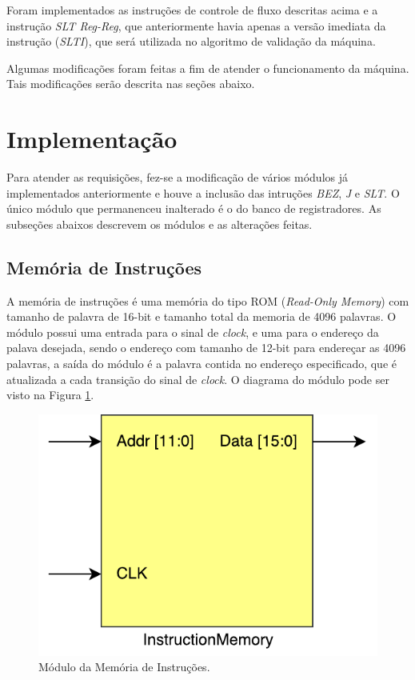 \documentclass[11pt,a4paper,titlepage]{article}
\begin{document}
Foram implementados as instruções de controle de fluxo descritas acima e a instrução \textit{SLT Reg-Reg}, que anteriormente havia apenas a versão imediata da instrução (\textit{SLTI}), que será utilizada no algoritmo de validação da máquina.

Algumas modificações foram feitas a fim de atender o funcionamento da máquina. Tais modificações serão descrita nas seções abaixo.

\section{Implementação}

Para atender as requisições, fez-se a modificação de vários módulos já implementados anteriormente e houve a inclusão das intruções \textit{BEZ}, \textit{J} e \textit{SLT}. O único módulo que permanenceu inalterado é o do banco de registradores. As subseções abaixos descrevem os módulos e as alterações feitas.

\subsection{Memória de Instruções}\label{subsec:imp-instmemory}

A memória de instruções é uma memória do tipo ROM (\textit{Read-Only Memory}) com tamanho de palavra de 16-bit e tamanho total da memoria de 4096 palavras. O módulo possui uma entrada para o sinal de \textit{clock}, e uma para o endereço da palava desejada, sendo o endereço com tamanho de 12-bit para endereçar as 4096 palavras, a saída do módulo é a palavra contida no endereço especificado, que é atualizada a cada transição do sinal de \textit{clock}. O diagrama do módulo pode ser visto na Figura \ref{fig:instrmemory}.

\begin{figure}[!h]
\centering
\includegraphics[scale=0.5]{images/InstructionMemory.pdf}
\caption{Módulo da Memória de Instruções.}
\label{fig:instrmemory}
\end{figure}
\end{document}
